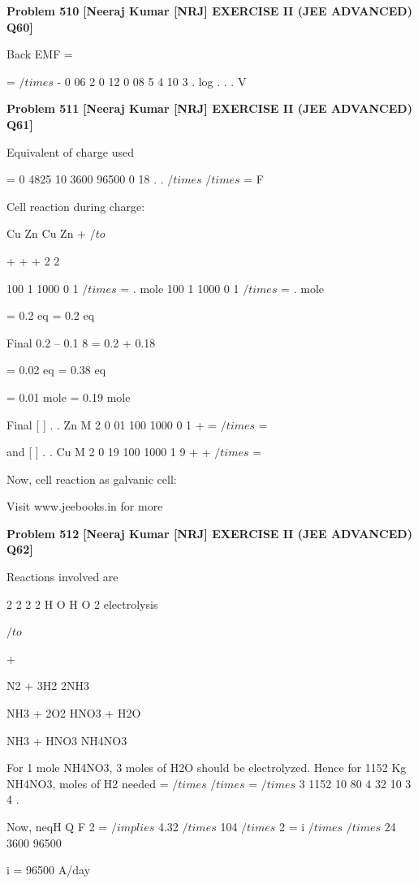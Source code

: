 \begin{problembox}
\textbf{Problem 510} \hfill \textbf{[Neeraj Kumar [NRJ] EXERCISE II (JEE ADVANCED) Q60]}
\label{q:ext-nrj_all_questions-510}

Back EMF =
 
=
$/times$
-
0 06
2
0 12
0 08
5 4
10 3
.
log .
.
.
V
\end{problembox}

\begin{problembox}
\textbf{Problem 511} \hfill \textbf{[Neeraj Kumar [NRJ] EXERCISE II (JEE ADVANCED) Q61]}
\label{q:ext-nrj_all_questions-511}

Equivalent of charge used 
 
 
= 0 4825 10
3600
96500
0 18
.
.
$/times$
$/times$
=
F
 
 Cell reaction during charge:
 
   Cu
Zn
Cu
Zn
+
 $/to$
 
+
+
+
2
2
 
                  
100
1
1000
0 1
$/times$
= . mole 
100
1
1000
0 1
$/times$
= . mole
 
                  = 0.2 eq                    = 0.2 eq
 
 Final           0.2 -- 0.1 8             = 0.2 + 0.18
 
                  = 0.02 eq                  = 0.38 eq
 
                  = 0.01 mole              = 0.19 mole
 
   Final [
]
.
.
Zn
M
2
0 01
100
1000
0 1
+ =
$/times$
=
 
 and [
]
.
.
Cu
M
2
0 19
100
1000
1 9
+ +
$/times$
=
 
 Now, cell reaction as galvanic cell:
 
 
Visit www.jeebooks.in for more
\end{problembox}

\begin{problembox}
\textbf{Problem 512} \hfill \textbf{[Neeraj Kumar [NRJ] EXERCISE II (JEE ADVANCED) Q62]}
\label{q:ext-nrj_all_questions-512}

Reactions involved are
 
 
2
2
2
2
H O
H
O
2
electrolysis
 
$/to$
    
+
 
 N2 + 3H2 
 2NH3
 
 NH3 + 2O2 
 HNO3 + H2O
 
 NH3 + HNO3 
 NH4NO3
 
 For 1 mole NH4NO3, 3 moles of H2O should be 
electrolyzed. Hence for 1152 Kg NH4NO3, moles 
of H2 needed =
$/times$
$/times$
=
$/times$
3
1152
10
80
4 32
10
3
4
.
 
 Now, neqH
Q
F
2 =
 $/implies$ 4.32 $/times$ 104 $/times$ 2 = i $/times$
$/times$
24
3600
96500
 
   i = 96500 A/day
\end{problembox}

